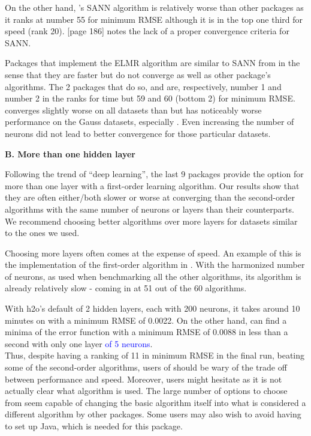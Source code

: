 On the other hand, 's SANN algorithm is relatively worse
than other packages as it ranks at number 55 for minimum RMSE although
it is in the top one third for speed (rank 20).
\cite{Nash-nlpor14}{[}page 186{]} notes the lack of a proper convergence
criteria for SANN.

Packages that implement the ELMR algorithm are similar to SANN from
 in the sense that they are faster but do not converge as
well as other package's algorithms. The 2 packages that do so,
 \citep{R-elmNNRcpp} and 
\citep{R-ELMR} are, respectively, number 1 and number 2 in the ranks for
time but 59 and 60 (bottom 2) for minimum RMSE.  converges
slightly worse on all datasets than  but has noticeably
worse performance on the Gauss datasets, especially . Even
increasing the number of neurons did not lead to better convergence for
those particular datasets.

\textbf{B. More than one hidden layer}

Following the trend of ``deep learning'', the last 9 packages provide
the option for more than one layer with a first-order learning
algorithm. Our results show that they are often either/both slower or
worse at converging than the second-order algorithms with the same
number of neurons or layers than their counterparts. We recommend
choosing better algorithms over more layers for datasets similar to the
ones we used.

Choosing more layers often comes at the expense of speed. An example of
this is the implementation of the first-order algorithm in 
\citep{R-h2o}. With the harmonized number of neurons, as used when
benchmarking all the other algorithms, its algorithm is already
relatively slow - coming in at 51 out of the 60 algorithms.

With h2o's default of 2 hidden layers, each with 200 neurons, it takes
around 10 minutes on  with a minimum RMSE of 0.0022. On
the other hand,  can find a minima of the error function with
a minimum RMSE of 0.0088 in less than a second with only one layer
\textcolor{blue}{of 5 neurons}. \\
Thus, despite having a ranking of 11 in minimum RMSE in the final run,
beating some of the second-order algorithms, users of  should
be wary of the trade off between performance and speed. Moreover, users
might hesitate as it is not actually clear what algorithm is used. The
large number of options to choose from seem capable of changing the
basic algorithm itself into what is considered a different algorithm by
other packages. Some users may also wish to avoid having to set up
\textsf{Java}, which is needed for this package.

